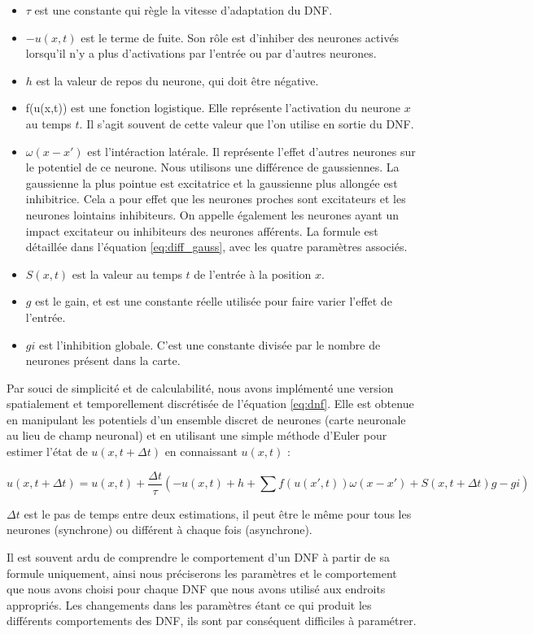 	\begin{itemize}
    	\item $\tau$ est une constante qui règle la vitesse d'adaptation du DNF.
    	\item $-u(x,t)$ est le terme de fuite. Son rôle est d'inhiber des neurones activés lorsqu'il n'y a plus d'activations par l'entrée ou par d'autres neurones.
		\item $h$ est la valeur de repos du neurone, qui doit être négative.
		\item f(u(x,t)) est une fonction logistique. Elle représente l'activation du neurone $x$ au temps $t$. Il s'agit souvent de cette valeur que l'on utilise en sortie du DNF.
		\item $\omega(x-x')$ est l'intéraction latérale. Il représente l'effet d'autres neurones sur le potentiel de ce neurone. Nous utilisons une différence de gaussiennes. La gaussienne la plus pointue est excitatrice et la gaussienne plus allongée est inhibitrice. Cela a pour effet que les neurones proches sont excitateurs et les neurones lointains inhibiteurs. On appelle également les neurones ayant un impact excitateur ou inhibiteurs des neurones afférents. La formule est détaillée dans l'équation \ref{eq:diff_gauss}, avec les quatre paramètres associés.
		\item $S(x,t)$ est la valeur au temps $t$ de l'entrée à la position $x$.
		\item $g$ est le gain, et est une constante réelle utilisée pour faire varier l'effet de l'entrée.
		\item $gi$ est l'inhibition globale. C'est une constante divisée par le nombre de neurones présent dans la carte. 

	\end{itemize}

	Par souci de simplicité et de calculabilité, nous avons implémenté une version spatialement et temporellement discrétisée de l'équation \ref{eq:dnf}. Elle est obtenue en manipulant les potentiels d'un ensemble discret de neurones (carte neuronale au lieu de champ neuronal) et en utilisant une simple méthode d'Euler pour estimer l'état de $u(x,t+\Delta t)$ en connaissant $u(x,t)$ :

	\begin{equation}
		u(x, t+\Delta t) = u(x, t) +\frac{\Delta t}{\tau}\left(-u(x, t)+ h + \sum f(u(x', t))\omega(x-x') + S(x, t+\Delta t)g - gi\right)
	\end{equation}

	$\Delta t$ est le pas de temps entre deux estimations, il peut être le même pour tous les neurones (synchrone) ou différent à chaque fois (asynchrone).

	Il est souvent ardu de comprendre le comportement d'un DNF à partir de sa formule uniquement, ainsi nous préciserons les paramètres et le comportement que nous avons choisi pour chaque DNF que nous avons utilisé aux endroits appropriés. Les changements dans les paramètres étant ce qui produit les différents comportements des DNF, ils sont par conséquent difficiles à paramétrer.


